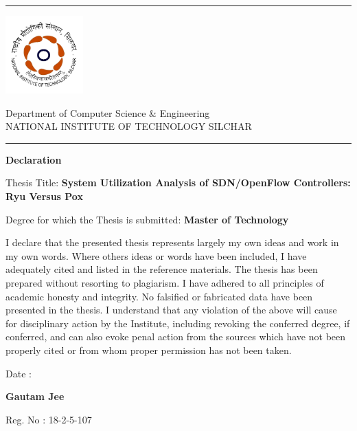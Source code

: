 \vspace*{0.5\fill}
\setlength{\headsep}{0.4in}
\noindent \rule{\linewidth}{1mm}
\begin{minipage}{0.2\textwidth}
\includegraphics[width=3cm,keepaspectratio]{images/NIT_Silchar_logo.png}
\end{minipage}
\begin{minipage}{\textwidth}
\large{Department of Computer Science \& Engineering}\\
\large{\MakeUppercase{NATIONAL INSTITUTE OF TECHNOLOGY SILCHAR}}
\end{minipage}

{\noindent\rule{\linewidth}{1mm}} \vspace{0.25in}

\begin{center}

{\bf \LARGE Declaration}

\end{center}

\par

Thesis Title: \textbf{System Utilization Analysis of SDN/OpenFlow Controllers: Ryu Versus Pox}

\vspace{0.25in}

Degree for which the Thesis is submitted: \textbf{Master of Technology}

\vspace{0.25in}

I declare that the presented thesis represents largely my own ideas and work in my own words. Where others ideas or words have been included, I have adequately cited and listed in the reference materials. The thesis has been prepared without resorting to plagiarism. I have adhered to all principles of academic honesty and integrity. No falsified or fabricated data have been presented in the thesis. I understand that any  violation of the above will cause for disciplinary action by  the Institute, including revoking the conferred degree, if  conferred, and can also evoke penal action from the sources which have not been properly cited or from whom proper permission has not been taken.


\vspace{0.5cm}
\begin{minipage}{0.5\textwidth}
\begin{flushleft}
Date :
\end{flushleft}
\end{minipage}
\begin{minipage}{0.4\textwidth}
\begin{flushright}

\vspace{0.5cm}

\vspace{0.25in}

\textbf{Gautam Jee}

Reg. No : 18-2-5-107
\end{flushright}
\vspace*{\fill}
\end{minipage}
\pagebreak

